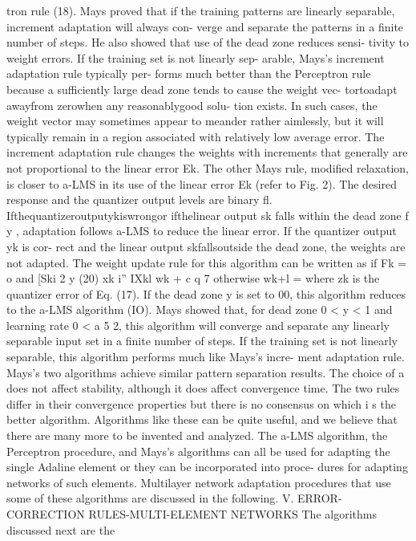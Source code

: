 tron rule (18). Mays proved that if the training patterns are linearly
separable, increment adaptation will always con- verge and separate the
patterns in a finite number of steps. He also showed that use of the
dead zone reduces sensi- tivity to weight errors. If the training set is
not linearly sep- arable, Mays's increment adaptation rule typically
per- forms much better than the Perceptron rule because a sufficiently
large dead zone tends to cause the weight vec- tortoadapt awayfrom
zerowhen any reasonablygood solu- tion exists. In such cases, the weight
vector may sometimes appear to meander rather aimlessly, but it will
typically remain in a region associated with relatively low average
error. The increment adaptation rule changes the weights with increments
that generally are not proportional to the linear error Ek. The other
Mays rule, modified relaxation, is closer to a-LMS in its use of the
linear error Ek (refer to Fig. 2). The desired response and the
quantizer output levels are binary fl.~ Ifthequantizeroutputykiswrongor
ifthelinear output sk falls within the dead zone f y , adaptation
follows a-LMS to reduce the linear error. If the quantizer output yk is
cor- rect and the linear output skfallsoutside the dead zone, the
weights are not adapted. The weight update rule for this algorithm can
be written as if Fk = o and {[}Ski 2 y (20) xk i'' IXkl wk + c q 7
otherwise wk+l = where zk is the quantizer error of Eq. (17). If the
dead zone y is set to 00, this algorithm reduces to the a-LMS algorithm
(IO). Mays showed that, for dead zone 0 \textless{} y \textless{} 1 and
learning rate 0 \textless{} a 5 2, this algorithm will converge and
separate any linearly separable input set in a finite number of steps.
If the training set is not linearly separable, this algorithm performs
much like Mays's incre- ment adaptation rule. Mays's two algorithms
achieve similar pattern separation results. The choice of a does not
affect stability, although it does affect convergence time. The two
rules differ in their convergence properties but there is no consensus
on which i s the better algorithm. Algorithms like these can be quite
useful, and we believe that there are many more to be invented and
analyzed. The a-LMS algorithm, the Perceptron procedure, and Mays's
algorithms can all be used for adapting the single Adaline element or
they can be incorporated into proce- dures for adapting networks of such
elements. Multilayer network adaptation procedures that use some of
these algorithms are discussed in the following. V. ERROR-CORRECTION
RULES-MULTI-ELEMENT NETWORKS The algorithms discussed next are the
